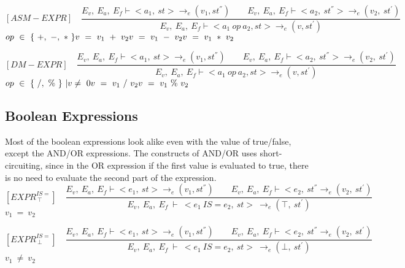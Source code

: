    	\[
   	[ASM-EXPR] \quad
   	\dfrac{E_v, \ E_a, \ E_f \vdash <a_1, \ st> \rightarrow_{e} (v_1, st^{''}) \qquad E_v, \ E_a, \ E_f \vdash <a_2, \ st^{''}> \rightarrow_e (v_2, \ st^{'})}{E_v, \ E_a, \ E_f \vdash <a_1 \ op \ a_2, st> \rightarrow_{e} (v, st^{'})}
   	\]
 	\begin{math}
 	op \ \in \ \{ \ +, \ -, \ * \ \} \newline
   	v \ = \ v_1 \ + \ v_2 \newline
   	v \ = \ v_1 \ - \ v_2 \newline
   	v \ = \ v_1 \ * \ v_2
   	\end{math}
   	
   	\[
   	[DM-EXPR] \quad
   	\dfrac{E_v, \ E_a, \ E_f \vdash <a_1, \ st> \rightarrow_{e} (v_1, st^{''}) \qquad E_v, \ E_a, \ E_f \vdash <a_2, \ st^{''}> \rightarrow_e (v_2, \ st^{'})}{E_v, \ E_a, \ E_f \vdash <a_1 \ op \ a_2, st> \rightarrow_{e} (v, st^{'})}
   	\]
   	\begin{math}
   	op \ \in \ \{ \ /, \ \% \ \} \ | v \not= \ 0 \newline 
   	v \ = \ v_1 \ / \ v_2 \newline
   	v \ = \ v_1 \ \% \ v_2
   	\end{math}   	   	   	

   	\subsection{Boolean Expressions}
   	Most of the boolean expressions look alike even with the value of true/false, except the AND/OR expressions. The constructs of AND/OR uses short-circuiting, since in the OR expression if the first value is evaluated to true, there is no need to evaluate the second part of the expression.
   	\[
   	[EXPR^{IS=}_{\ \top}] \quad
   	\dfrac{E_v, \ E_a, \ E_f \vdash <e_1, \ st> \rightarrow_e (v_1, st^{''}) \qquad E_v, \ E_a, \ E_f \vdash <e_2, \ st^{''} \rightarrow_e (v_2, \ st^{'})}{E_v, \ E_a, \ E_f \ \vdash \ <e_1
   	\ IS= e_2, \ st> \ \rightarrow_e (\top, \ st^{'})}
   	\]
   	\begin{math}
   	v_1 \ = \ v_2 
   	\end{math}

   	\[
   	[EXPR^{IS=}_{\ \bot}] \quad
   	\dfrac{E_v, \ E_a, \ E_f \vdash <e_1, \ st> \rightarrow_e (v_1, st^{''}) \qquad E_v, \ E_a, \ E_f \vdash <e_2, \ st^{''} \rightarrow_e (v_2, \ st^{'})}{E_v, \ E_a, \ E_f \ \vdash \ <e_1
   	\ IS= e_2, \ st> \ \rightarrow_e (\bot, \ st^{'})}
   	\]
	\begin{math}
   	v_1 \ \not= \ v_2
   	\end{math}


